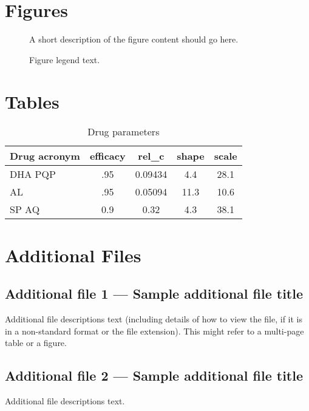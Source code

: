 \documentclass{bmcart}
\begin{document}
\begin{backmatter}

\section*{Figures}
  \begin{figure}[h!]
  \caption{
      A short description of the figure content
      should go here.}
      \end{figure}

\begin{figure}[h!]
  \caption{
      Figure legend text.}
      \end{figure}


\section*{Tables}
\begin{table}[h!]
\caption{Drug parameters}
      \begin{tabular}{l | cccc}
        \hline
        Drug acronym & efficacy & rel\_c & shape & scale \\ \hline
        DHA PQP & .95 & 0.09434 & 4.4 & 28.1\\    
        AL & .95 & 0.05094 & 11.3 & 10.6\\
        SP AQ & 0.9 & 0.32 & 4.3 & 38.1\\ \hline
      \end{tabular}
\end{table}


\section*{Additional Files}
  \subsection*{Additional file 1 --- Sample additional file title}
    Additional file descriptions text (including details of how to
    view the file, if it is in a non-standard format or the file extension).  This might
    refer to a multi-page table or a figure.

  \subsection*{Additional file 2 --- Sample additional file title}
    Additional file descriptions text.


\end{backmatter}
\end{document}
